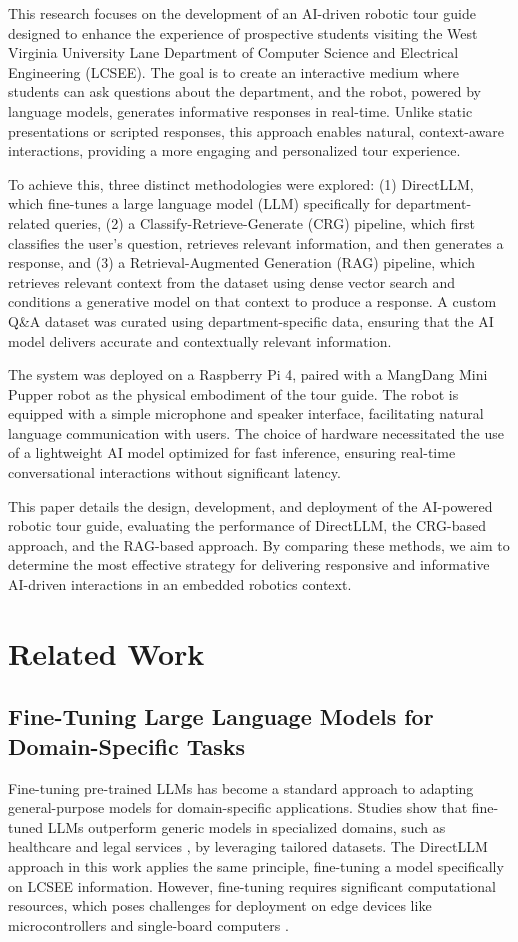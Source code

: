 \documentclass[conference]{IEEEtran}
\begin{document}
This research focuses on the development of an AI-driven robotic tour guide designed to enhance the experience of prospective students visiting the West Virginia University Lane Department of Computer Science and Electrical Engineering (LCSEE). 
The goal is to create an interactive medium where students can ask questions about the department, and the robot, powered by language models, generates informative responses in real-time. 
Unlike static presentations or scripted responses, this approach enables natural, context-aware interactions, providing a more engaging and personalized tour experience.

To achieve this, three distinct methodologies were explored: 
(1) DirectLLM, which fine-tunes a large language model (LLM) specifically for department-related queries, 
(2) a Classify-Retrieve-Generate (CRG) pipeline, which first classifies the user's question, retrieves relevant information, and then generates a response, and
(3) a Retrieval-Augmented Generation (RAG) pipeline, which retrieves relevant context from the dataset using dense vector search and conditions a generative model on that context to produce a response.
A custom Q\&A dataset was curated using department-specific data, ensuring that the AI model delivers accurate and contextually relevant information.

The system was deployed on a Raspberry Pi 4, paired with a MangDang Mini Pupper \cite{b1} robot as the physical embodiment of the tour guide. 
The robot is equipped with a simple microphone and speaker interface, facilitating natural language communication with users. 
The choice of hardware necessitated the use of a lightweight AI model optimized for fast inference, ensuring real-time conversational interactions without significant latency.

This paper details the design, development, and deployment of the AI-powered robotic tour guide, evaluating the performance of DirectLLM, the CRG-based approach, and the RAG-based approach. 
By comparing these methods, we aim to determine the most effective strategy for delivering responsive and informative AI-driven interactions in an embedded robotics context.

\section{Related Work}
\subsection{Fine-Tuning Large Language Models for Domain-Specific Tasks}
Fine-tuning pre-trained LLMs has become a standard approach to adapting general-purpose models for domain-specific applications. 
Studies show that fine-tuned LLMs outperform generic models in specialized domains, such as healthcare and legal services \cite{b2}, by leveraging tailored datasets. 
The DirectLLM approach in this work applies the same principle, fine-tuning a model specifically on LCSEE information. 
However, fine-tuning requires significant computational resources, which poses challenges for deployment on edge devices like microcontrollers and single-board computers \cite{b3}.
\end{document}
